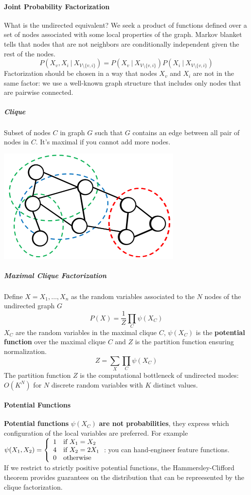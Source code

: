\documentclass[10pt]{report}
\begin{document}
\paragraph{Joint Probability Factorization} What is the undirected equivalent? We seek a product of functions defined over a set of nodes associated with some local properties of the graph. Markov blanket tells that nodes that are not neighbors are conditionally independent given the rest of the nodes.$$P(X_v,X_i\:|\:X_{V\setminus\{v,i\}}) = P(X_v\:|\:X_{V\setminus\{v,i\}})P(X_i\:|\:X_{V\setminus\{v,i\}})$$
Factorization should be chosen in a way that nodes $X_v$ and $X_i$ are not in the same factor: we use a well-known graph structure that includes only nodes that are pairwise connected.
\subparagraph{Clique} Subset of nodes $C$ in graph $G$ such that $G$ contains an edge between all pair of nodes in $C$. It's maximal if you cannot add more nodes.
\begin{center}
	\includegraphics[scale=0.5]{210.png}
\end{center}
\subparagraph{Maximal Clique Factorization} Define $X = X_1,\ldots,X_n$ as the random variables associated to the $N$ nodes of the undirected graph $G$ $$P(X)=\frac{1}{Z}\prod_C \psi(X_C)$$
$X_C$ are the random variables in the maximal clique $C$, $\psi(X_C)$ is the \textbf{potential function} over the maximal clique $C$ and $Z$ is the partition function ensuring normalization.
$$Z = \sum_X\prod_C\psi(X_C)$$
The partition function $Z$ is the computational bottleneck of undirected modes: $O(K^N)$ for $N$ discrete random variables with $K$ distinct values.
\paragraph{Potential Functions} \textbf{Potential functions} $\psi(X_C)$ \textbf{are not probabilities}, they express which configuration of the local variables are preferred. For example $\psi(X_1,X_2)=\left\{ \begin{array}{l l}
1&\text{if }X_1 = X_2\\
4&\text{if }X_2 = 2X_1\\
0&\text{otherwise}
\end{array}\right.$: you can hand-engineer feature functions.\\
If we restrict to strictly positive potential functions, the Hammersley-Clifford theorem provides guarantees on the distribution that can be repreesented by the clique factorization.
\end{document}
